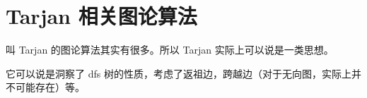 \section{Tarjan 相关图论算法}

叫 Tarjan 的图论算法其实有很多。所以 Tarjan 实际上可以说是一类思想。

它可以说是洞察了 dfs 树的性质，考虑了返祖边，跨越边（对于无向图，实际上并不可能存在）等。

